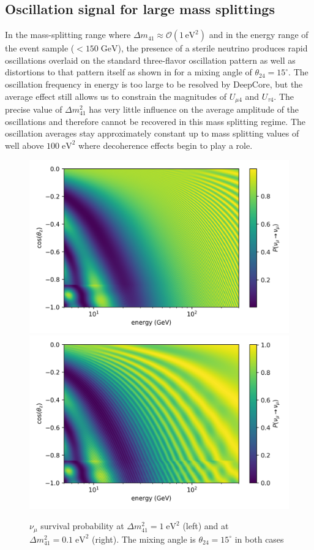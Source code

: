 \subsection{Oscillation signal for large mass splittings}
In the mass-splitting range where $\Delta m_{41}\approx\mathcal{O}(1\,\mathrm{eV^2})$ and in the energy range of the event sample ($<150\;\mathrm{GeV}$), the presence of a sterile neutrino produces rapid oscillations overlaid on the standard three-flavor oscillation pattern as well as distortions to that pattern itself as shown in  for a mixing angle of $\theta_{24}=15^\circ$. The oscillation frequency in energy is too large to be resolved by DeepCore, but the average effect still allows us to constrain the magnitudes of $U_{\mu4}$ and $U_{\tau4}$. The precise value of $\Delta m^2_{41}$ has very little influence on the average amplitude of the oscillations and therefore cannot be recovered in this mass splitting regime. The oscillation averages stay approximately constant up to mass splitting values of well above $100\;\mathrm{eV^2}$ where decoherence effects begin to play a role\cite{atmo_decoherence}.
\begin{figure}
    \centering
    \includegraphics[width=0.45\linewidth]{figures/measurement/sterile_analysis/physics/dm41_1.0eV2_th24_15deg_avg_height_10-30km_ana_binning_range.png}
    \includegraphics[width=0.45\linewidth]{figures/measurement/sterile_analysis/physics/dm41_0.1eV2_th24_15deg_avg_height_10-30km_ana_binning_range.png}
    \caption{$\nu_{\mu}$ survival probability at $\Delta m^2_{41}=1\;\mathrm{eV^2}$ (left) and at $\Delta m^2_{41}=0.1\;\mathrm{eV^2}$ (right). The mixing angle is $\theta_{24}=15^\circ$ in both cases}
    \label{fig:numu_survival_1eV2_analysis_binning_range}
\end{figure}

